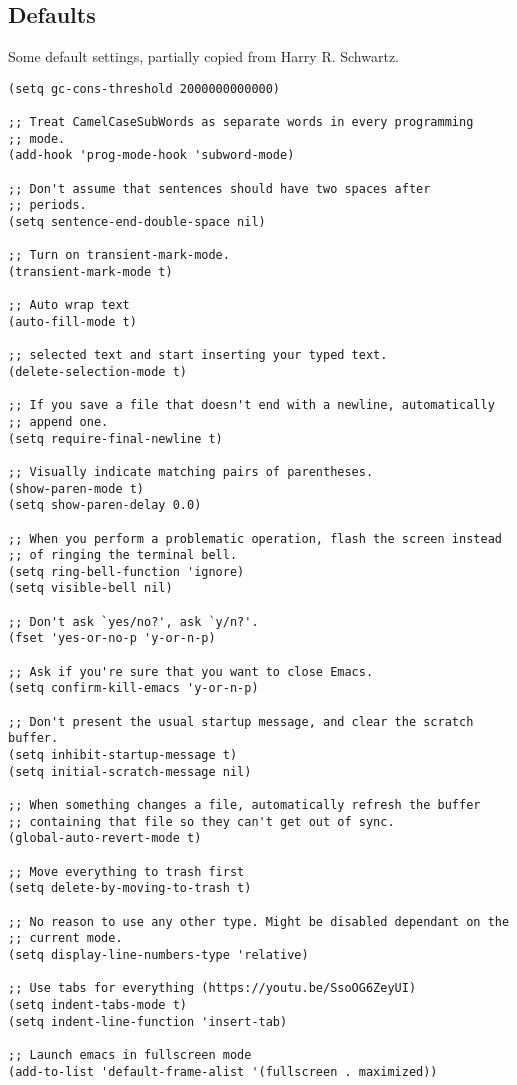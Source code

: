 \documentclass[11pt]{article}
\begin{document}
\subsection{Defaults}
\label{sec:orgafa075f}
Some default settings, partially copied from Harry R. Schwartz.
\begin{verbatim}
(setq gc-cons-threshold 2000000000000)

;; Treat CamelCaseSubWords as separate words in every programming
;; mode.
(add-hook 'prog-mode-hook 'subword-mode)

;; Don't assume that sentences should have two spaces after
;; periods.
(setq sentence-end-double-space nil)

;; Turn on transient-mark-mode.
(transient-mark-mode t)

;; Auto wrap text
(auto-fill-mode t)

;; selected text and start inserting your typed text.
(delete-selection-mode t)

;; If you save a file that doesn't end with a newline, automatically
;; append one.
(setq require-final-newline t)

;; Visually indicate matching pairs of parentheses.
(show-paren-mode t)
(setq show-paren-delay 0.0)

;; When you perform a problematic operation, flash the screen instead
;; of ringing the terminal bell.
(setq ring-bell-function 'ignore)
(setq visible-bell nil)

;; Don't ask `yes/no?', ask `y/n?'.
(fset 'yes-or-no-p 'y-or-n-p)

;; Ask if you're sure that you want to close Emacs.
(setq confirm-kill-emacs 'y-or-n-p)

;; Don't present the usual startup message, and clear the scratch buffer.
(setq inhibit-startup-message t)
(setq initial-scratch-message nil)

;; When something changes a file, automatically refresh the buffer
;; containing that file so they can't get out of sync.
(global-auto-revert-mode t)

;; Move everything to trash first
(setq delete-by-moving-to-trash t)

;; No reason to use any other type. Might be disabled dependant on the
;; current mode.
(setq display-line-numbers-type 'relative)

;; Use tabs for everything (https://youtu.be/SsoOG6ZeyUI)
(setq indent-tabs-mode t)
(setq indent-line-function 'insert-tab)

;; Launch emacs in fullscreen mode
(add-to-list 'default-frame-alist '(fullscreen . maximized))


\end{verbatim}
\end{document}
